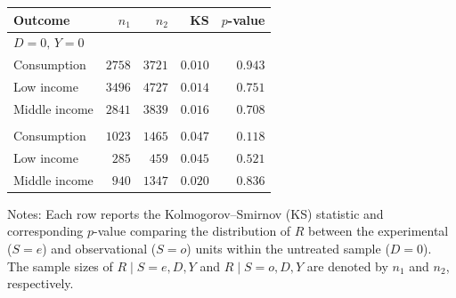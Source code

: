 \begin{threeparttable}
\begin{tabular}{lrrrr}
\toprule
Outcome & $n_1$ & $n_2$ & KS & $p$-value \\
\midrule
\multicolumn{5}{l}{$D=0,\, Y=0$}\\
\quad Consumption & $2758$ & $3721$ & $0.010$ & $0.943$ \\
\quad Low income & $3496$ & $4727$ & $0.014$ & $0.751$ \\
\quad Middle income & $2841$ & $3839$ & $0.016$ & $0.708$ \\
\addlinespace[0.6em]
\multicolumn{5}{l}{$D=0,\, Y=1$}\\
\quad Consumption & $1023$ & $1465$ & $0.047$ & $0.118$ \\
\quad Low income & $285$ & $459$ & $0.045$ & $0.521$ \\
\quad Middle income & $940$ & $1347$ & $0.020$ & $0.836$ \\
\bottomrule
\end{tabular}
\begin{tablenotes}[flushleft]
\small
\item Notes: Each row reports the Kolmogorov--Smirnov (KS) statistic and corresponding $p$-value comparing the distribution of $R$ between the experimental ($S=e$) and observational ($S=o$) units within the untreated sample ($D=0$). The sample sizes of $R \mid S=e, D, Y$ and $R \mid S=o, D, Y$ are denoted by $n_1$ and $n_2$, respectively.
\end{tablenotes}
\end{threeparttable}
